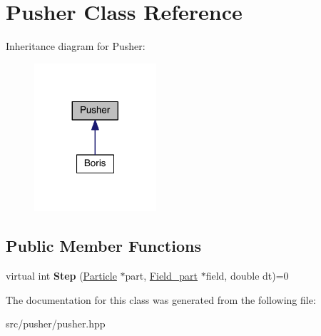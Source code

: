 \hypertarget{class_pusher}{}\section{Pusher Class Reference}
\label{class_pusher}


Inheritance diagram for Pusher\+:\nopagebreak
\begin{figure}[H]
\begin{center}
\leavevmode
\includegraphics[width=128pt]{class_pusher__inherit__graph}
\end{center}
\end{figure}
\subsection*{Public Member Functions}
\begin{DoxyCompactItemize}
\item 
\hypertarget{class_pusher_a8a9a5faace14e07e8b42fb51cc83088e}{}\label{class_pusher_a8a9a5faace14e07e8b42fb51cc83088e} 
virtual int {\bfseries Step} (\hyperlink{struct_particle}{Particle} $\ast$part, \hyperlink{struct_field__part}{Field\+\_\+part} $\ast$field, double dt)=0
\end{DoxyCompactItemize}


The documentation for this class was generated from the following file\+:\begin{DoxyCompactItemize}
\item 
src/pusher/pusher.\+hpp\end{DoxyCompactItemize}
